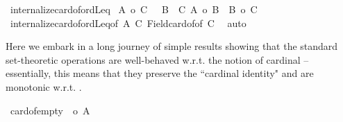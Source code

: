 \begin{isabellebody}
%
\endisatagproof
{\isafoldproof}%
%
\isadelimproof
\isanewline
%
\endisadelimproof
\isanewline
{}\isamarkupfalse%
\ internalize{\isacharunderscore}{\kern0pt}card{\isacharunderscore}{\kern0pt}of{\isacharunderscore}{\kern0pt}ordLeq{}{\isacharcolon}{\kern0pt}\isanewline
{\isachardoublequoteopen}{\isacharparenleft}{\kern0pt}\ {\isacharbar}{\kern0pt}A{\isacharbar}{\kern0pt}\ {\isasymle}o\ {\isacharbar}{\kern0pt}C{\isacharbar}{\kern0pt}\ {\isacharparenright}{\kern0pt}\ {\isacharequal}{\kern0pt}\ {\isacharparenleft}{\kern0pt}{\isasymexists}B\ {\isasymle}\ C{\isachardot}{\kern0pt}\ {\isacharbar}{\kern0pt}A{\isacharbar}{\kern0pt}\ {\isacharequal}{\kern0pt}o\ {\isacharbar}{\kern0pt}B{\isacharbar}{\kern0pt}\ {\isasymand}\ {\isacharbar}{\kern0pt}B{\isacharbar}{\kern0pt}\ {\isasymle}o\ {\isacharbar}{\kern0pt}C{\isacharbar}{\kern0pt}\ {\isacharparenright}{\kern0pt}{\isachardoublequoteclose}\isanewline
%
\isadelimproof
%
\endisadelimproof
%
\isatagproof
{}\isamarkupfalse%
\ internalize{\isacharunderscore}{\kern0pt}card{\isacharunderscore}{\kern0pt}of{\isacharunderscore}{\kern0pt}ordLeq{\isacharbrackleft}{\kern0pt}of\ {\isachardoublequoteopen}A{\isachardoublequoteclose}\ {\isachardoublequoteopen}{\isacharbar}{\kern0pt}C{\isacharbar}{\kern0pt}{\isachardoublequoteclose}{\isacharbrackright}{\kern0pt}\ Field{\isacharunderscore}{\kern0pt}card{\isacharunderscore}{\kern0pt}of{\isacharbrackleft}{\kern0pt}of\ C{\isacharbrackright}{\kern0pt}\ \isamarkupfalse%
\ auto%
\endisatagproof
{\isafoldproof}%
%
\isadelimproof
%
\endisadelimproof
%
\isadelimdocument
%
\endisadelimdocument
%
\isatagdocument
%
\isamarkuptrue%
%
\endisatagdocument
{\isafolddocument}%
%
\isadelimdocument
%
\endisadelimdocument
%
\begin{isamarkuptext}%
Here we embark in a long journey of simple results showing
that the standard set-theoretic operations are well-behaved w.r.t. the notion of
cardinal -- essentially, this means that they preserve the ``cardinal identity"
 and are monotonic w.r.t. .%
\end{isamarkuptext}\isamarkuptrue%
\isamarkupfalse%
\ card{\isacharunderscore}{\kern0pt}of{\isacharunderscore}{\kern0pt}empty{\isacharcolon}{\kern0pt}\ {\isachardoublequoteopen}{\isacharbar}{\kern0pt}{\isacharbraceleft}{\kern0pt}{\isacharbraceright}{\kern0pt}{\isacharbar}{\kern0pt}\ {\isasymle}o\ {\isacharbar}{\kern0pt}A{\isacharbar}{\kern0pt}{\isachardoublequoteclose}\isanewline

\end{isabellebody}
